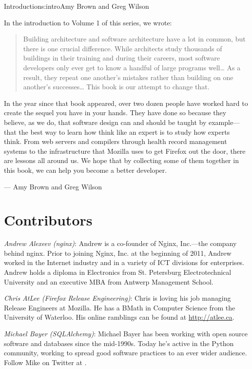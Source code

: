 \begin{aosachapter}{Introduction}{s:intro}{Amy Brown and Greg Wilson}

In the introduction to Volume 1 of this series, we wrote:

\begin{quotation}
Building architecture and software architecture have a lot in common,
but there is one crucial difference.  While architects study thousands
of buildings in their training and during their careers, most software
developers only ever get to know a handful of large programs
well{\ldots} As a result, they repeat one another's mistakes rather
than building on one another's successes{\ldots} This book is our
attempt to change that.
\end{quotation}

\noindent
In the year since that book appeared, over two dozen people have
worked hard to create the sequel you have in your hands.  They have
done so because they believe, as we do, that software design can and
should be taught by example---that the best way to learn how think
like an expert is to study how experts think.  From web servers and
compilers through health record management systems to the
infrastructure that Mozilla uses to get Firefox out the door, there
are lessons all around us.  We hope that by collecting some of them
together in this book, we can help you become a better developer.

\hspace{6cm} --- Amy Brown and Greg Wilson

\section*{Contributors}

\hspace{\parindent} \emph{Andrew Alexeev (nginx)}: Andrew is a co-founder of Nginx, Inc.---the
company behind nginx. Prior to joining Nginx, Inc. at the beginning of 2011,
Andrew worked in the Internet industry and in a variety of ICT divisions for
enterprises. Andrew holds a diploma in Electronics from St. Petersburg
Electrotechnical University and an executive MBA from Antwerp
Management School.

\emph{Chris AtLee (Firefox Release Engineering)}: Chris is loving his job
managing Release Engineers at Mozilla. He has a BMath in Computer Science
from the University of Waterloo. His online ramblings can be found at
\url{http://atlee.ca}.

\emph{Michael Bayer (SQLAlchemy)}: Michael Bayer has been working with open
source software and databases since the mid-1990s. Today he's active in the
Python community, working to spread good software practices to an ever wider
audience. Follow Mike on Twitter at .


\end{aosachapter}
